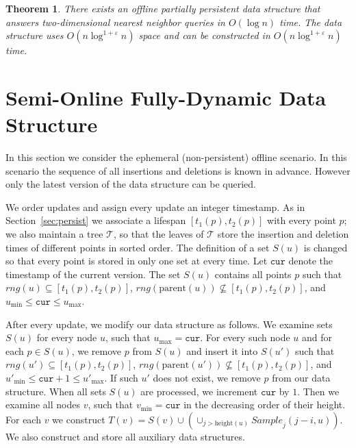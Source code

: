 \documentclass[10pt,a4paper]{amsart}
\newcommand{\Sample}{\mathit{Sample}}
\newcommand{\Sub}{\mathit{Sub}}
\newcommand{\cur}{\mathtt{cur}}
\newcommand{\oS}{\overline{S}}
\newcommand{\mcT}{\mathcal{T}}
\newcommand{\eps}{\varepsilon}
\newtheorem{theorem}{Theorem}
\begin{document}
\begin{theorem}
  \label{theor:persist}
  There exists an offline partially persistent data structure that answers two-dimensional nearest neighbor queries in $O(\log n)$ time. The data structure uses $O(n \log^{1+\eps} n)$ space and can be constructed in $O(n\log^{1+\eps}n)$ time. 
\end{theorem}

\section{Semi-Online Fully-Dynamic Data Structure}
\label{sec:offline}
In this section we consider the ephemeral (non-persistent) offline  scenario. In this scenario the sequence of all insertions and deletions is known in advance. However only the latest version of the data structure can be queried.

We order updates and assign every update an integer timestamp. As in Section~\ref{sec:persist} we associate a lifespan $[t_1(p),t_2(p)]$ with every point $p$; we also maintain a tree $\mcT$, so that the leaves of $\mcT$ store the insertion and deletion times of different points in sorted order.
The definition of a set $S(u)$ is changed so that every point is stored in only one set at every time.
Let $\cur$ denote the timestamp of the current version.  The set $S(u)$ contains all points $p$ such that
$rng(u)\subseteq [t_{1}(p),t_{2}(p)]$, $rng(\text{parent}(u))\not\subseteq [t_{1}(p),t_{2}(p)]$,
and $u_{\min}\le \cur \le u_{\max}$.

After every update, we modify our data structure as follows.
We examine sets $S(u)$ for every node $u$, such that $u_{\max}=\cur$. For every such node $u$ and for each $p\in S(u)$, we remove $p$ from $S(u)$ and insert it into $S(u')$ such that
$rng(u')\subseteq [t_{1}(p),t_{2}(p)]$, $rng(\text{parent}(u'))\not\subseteq [t_{1}(p),t_{2}(p)]$,
and $u'_{\min}\le \cur+1 \le u'_{\max}$.  If such $u'$ does not exist, we remove $p$ from our data structure.
When all sets $S(u)$ are processed, we increment $\cur$ by $1$.
Then we examine all nodes $v$, such that $v_{\min}=\cur$ in the decreasing order of their height.  For each $v$ we 
construct $T(v)=S(v)\cup (\cup_{j>\text{height}(u)} \Sample_j(j-i,u))$. We also construct  and store all auxiliary data structures. 
\end{document}
